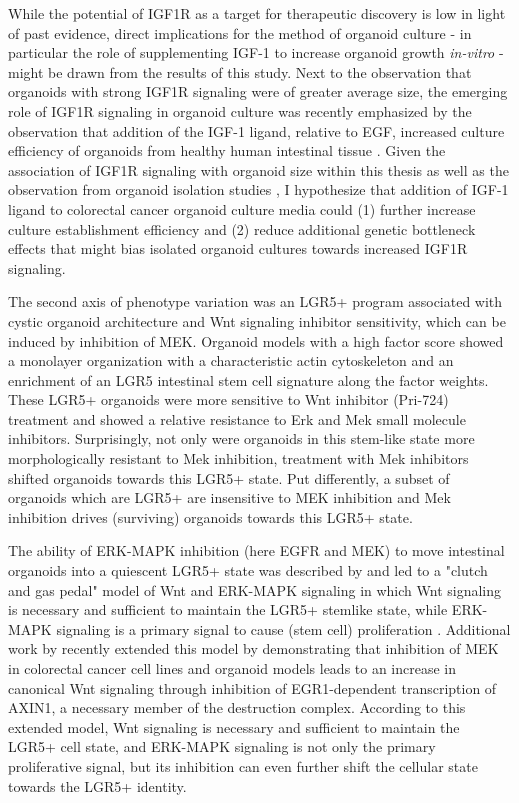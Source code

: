 \begin{flushleft}
While the potential of IGF1R as a target for therapeutic discovery is low in light of past evidence, direct implications for the method of organoid culture - in particular the role of supplementing IGF-1 to increase organoid growth \textit{in-vitro} - might be drawn from the results of this study. Next to the observation that organoids with strong IGF1R signaling were of greater average size, the emerging role of IGF1R signaling in organoid culture was recently emphasized by the observation that addition of the IGF-1 ligand, relative to EGF, increased culture efficiency of organoids from healthy human intestinal tissue \parencite{fujiiHumanIntestinalOrganoids2018a}. Given the association of IGF1R signaling with organoid size within this thesis as well as the observation from organoid isolation studies \parencite{fujiiHumanIntestinalOrganoids2018a}, I hypothesize that addition of IGF-1 ligand to colorectal cancer organoid culture media could (1) further increase culture establishment efficiency and (2) reduce additional genetic bottleneck effects that might bias isolated organoid cultures towards increased IGF1R signaling.
\smallbreak

The second axis of phenotype variation was an LGR5+ program associated with cystic organoid architecture and Wnt signaling inhibitor sensitivity, which can be induced by inhibition of MEK. Organoid models with a high factor score showed a monolayer organization with a characteristic actin cytoskeleton and an enrichment of an LGR5 intestinal stem cell signature along the factor weights. These LGR5+ organoids were more sensitive to Wnt inhibitor (Pri-724) treatment and showed a relative resistance to Erk and Mek small molecule inhibitors. Surprisingly, not only were organoids in this stem-like state more morphologically resistant to Mek inhibition, treatment with Mek inhibitors shifted organoids towards this LGR5+ state. Put differently, a subset of organoids which are LGR5+ are insensitive to MEK inhibition and Mek inhibition drives (surviving) organoids towards this LGR5+ state.
\smallbreak

The ability of ERK-MAPK inhibition (here EGFR and MEK) to move intestinal organoids into a quiescent LGR5+ state was described by \parencite{basakInducedQuiescenceLgr52017} and led to a "clutch and gas pedal" model of Wnt and ERK-MAPK signaling in which Wnt signaling is necessary and sufficient to maintain the LGR5+ stemlike state, while ERK-MAPK signaling is a primary signal to cause (stem cell) proliferation \parencite{basakInducedQuiescenceLgr52017}. Additional work by \parencite{zhanMEKInhibitorsActivate2019a} recently extended this model by demonstrating that inhibition of MEK in colorectal cancer cell lines and organoid models leads to an increase in canonical Wnt signaling through inhibition of EGR1-dependent transcription of AXIN1, a necessary member of the destruction complex. According to this extended model, Wnt signaling is necessary and sufficient to maintain the LGR5+ cell state, and ERK-MAPK signaling is not only the primary proliferative signal, but its inhibition can even further shift the cellular state towards the LGR5+ identity. 


\end{flushleft}

